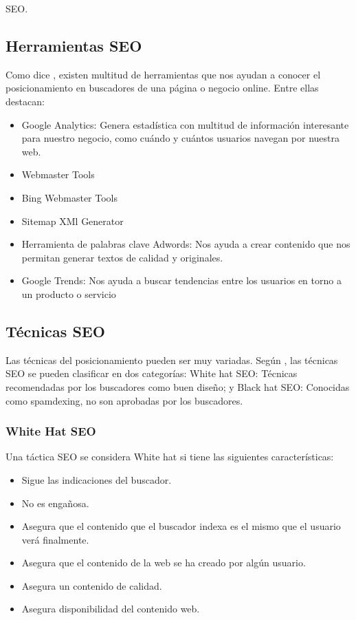\begin{section}{SEO.}
		\subsection{Herramientas SEO}
		
		Como dice \cite{seoc}, existen multitud de herramientas que nos ayudan a conocer el posicionamiento en buscadores de una página o negocio online. Entre ellas destacan:
		\begin{itemize}
			\item Google Analytics: Genera estadística con multitud de información interesante para nuestro negocio,  como cuándo y cuántos usuarios navegan por nuestra web.
			\item Webmaster Tools
			\item Bing Webmaster Tools
			\item Sitemap XMl Generator
			\item Herramienta de palabras clave Adwords: Nos ayuda a crear contenido que nos permitan generar textos de calidad y originales.
			\item Google Trends: Nos ayuda a buscar tendencias entre los usuarios en torno a un producto o servicio
		\end{itemize}
	
		\subsection{Técnicas SEO}
		Las técnicas del posicionamiento pueden ser muy variadas. Según \cite{tutorial}, las técnicas SEO se pueden clasificar en dos categorías: White hat SEO: Técnicas recomendadas por los buscadores como buen diseño; y Black hat SEO: Conocidas como spamdexing, no son aprobadas por los buscadores.

		\subsubsection{White Hat SEO}
			Una táctica SEO se considera White hat si tiene las siguientes características:
			\begin{itemize}
				\item Sigue las indicaciones del buscador.
				\item No es engañosa.
				\item Asegura que el contenido que el buscador indexa es el mismo que el usuario verá finalmente.
				\item Asegura que el contenido de la web se ha creado por algún usuario.
				\item Asegura un contenido de calidad.
				\item Asegura disponibilidad del contenido web.
			\end{itemize}
		

\end{section}

